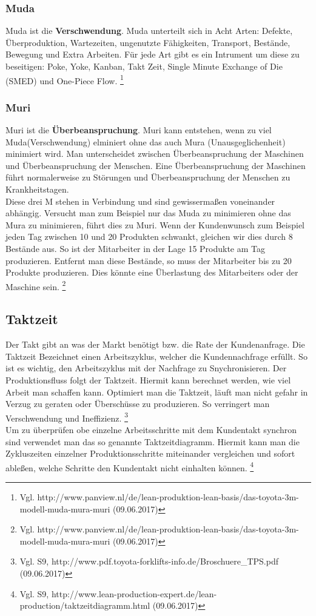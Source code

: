 \documentclass[00_ToyotaProduktionssystem.tex]{subfiles}
\begin{document}
\subsubsection{Muda}
Muda ist die \textbf{Verschwendung}. Muda unterteilt sich in Acht Arten: Defekte, Überproduktion, Wartezeiten, ungenutzte Fähigkeiten, Transport, Bestände, Bewegung und Extra Arbeiten. Für jede Art gibt es ein Intrument um diese zu beseitigen: Poke, Yoke, Kanban, Takt Zeit, Single Minute Exchange of Die (SMED) und One-Piece Flow. 
\footnote{Vgl.  http://www.panview.nl/de/lean-produktion-lean-basis/das-toyota-3m-modell-muda-mura-muri (09.06.2017)}
\subsubsection{Muri}
Muri ist die \textbf{Überbeanspruchung}. Muri kann entstehen, wenn zu viel Muda(Verschwendung) elminiert ohne das auch Mura (Unausgeglichenheit) minimiert wird. Man unterscheidet zwischen Überbeanspruchung der Maschinen und Überbeanspruchung der Menschen. Eine Überbeanspruchung der Maschinen führt normalerweise zu Störungen und Überbeanspruchung der Menschen zu Krankheitstagen. \\ Diese drei M stehen in Verbindung und sind gewissermaßen voneinander abhängig. Versucht man zum Beispiel nur das Muda zu minimieren ohne das Mura zu minimieren, führt dies zu Muri. Wenn der Kundenwunsch zum Beispiel jeden Tag zwischen 10 und 20 Produkten schwankt, gleichen wir dies durch 8 Bestände aus. So ist der Mitarbeiter in der Lage 15 Produkte am Tag produzieren. Entfernt man diese Bestände, so muss der Mitarbeiter bis zu 20 Produkte produzieren. Dies könnte eine Überlastung des Mitarbeiters oder der Maschine sein. 
\footnote{Vgl.  http://www.panview.nl/de/lean-produktion-lean-basis/das-toyota-3m-modell-muda-mura-muri (09.06.2017)}

\subsection{Taktzeit}
Der Takt gibt an was der Markt benötigt bzw. die Rate der Kundenanfrage. Die Taktzeit Bezeichnet einen Arbeitszyklus, welcher die Kundennachfrage erfüllt. So ist es wichtig, den Arbeitszyklus mit der Nachfrage zu Snychronisieren. Der Produktionsfluss folgt der Taktzeit. Hiermit kann berechnet werden, wie viel Arbeit man schaffen kann. Optimiert man die Taktzeit, läuft man nicht gefahr in Verzug zu geraten oder Überschüsse zu produzieren. So verringert man Verschwendung und Ineffizienz. 
\footnote{Vgl. S9,  http://www.pdf.toyota-forklifts-info.de/Broschuere\_TPS.pdf (09.06.2017)}
\\
Um zu überprüfen obe einzelne Arbeitsschritte mit dem Kundentakt synchron sind verwendet man das so genannte Taktzeitdiagramm. Hiermit kann man die Zykluszeiten einzelner Produktionsschritte miteinander vergleichen und sofort ableßen, welche Schritte den Kundentakt nicht einhalten können. 
\footnote{Vgl. S9,  http://www.lean-production-expert.de/lean-production/taktzeitdiagramm.html (09.06.2017)}
\end{document}
